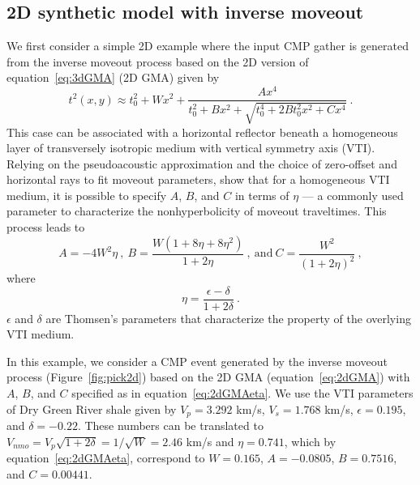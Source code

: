 \subsection{2D synthetic model with inverse moveout}

We first consider a simple 2D example where the input CMP gather is generated from the inverse moveout process based on the 2D version \cite[]{fomelstovas} of equation~\ref{eq:3dGMA} (2D GMA) given by
\begin{equation}
\label{eq:2dGMA}
t^2(x,y) \approx t^2_0 + W x^2 + \frac{A x^4}{t^2_0+Bx^2+\sqrt{t^4_0+2Bt^2_0x^2+Cx^4}} ~.
\end{equation}
This case can be associated with a horizontal reflector beneath a homogeneous layer of transversely isotropic medium with vertical symmetry axis (VTI). Relying on the pseudoacoustic approximation and the choice of zero-offset and horizontal rays to fit moveout parameters, \cite{fomelstovas} show that for a homogeneous VTI medium, it is possible to specify $A$, $B$, and $C$ in terms of $\eta$ \cite[]{alkatsvankin} --- a commonly used parameter to characterize the nonhyperbolicity of moveout traveltimes. This process leads to
\begin{equation}
\label{eq:2dGMAeta}
A = -4 W^2 \eta ~,~ B= \frac{W(1+8\eta + 8 \eta^2)}{1+2\eta}~,~\text{and}~C=\frac{W^2}{(1+2\eta)^2}~,
\end{equation}
where
\begin{equation}
  \eta = \frac{\epsilon-\delta}{1+2 \delta}~.
\end{equation}
$\epsilon$ and $\delta$ are Thomsen's parameters that characterize the property of the overlying VTI medium.

In this example, we consider a CMP event generated by the inverse moveout process (Figure~\ref{fig:pick2d}) based on the 2D GMA (equation~\ref{eq:2dGMA}) with $A$, $B$, and $C$ specified as in equation~\ref{eq:2dGMAeta}. We use the VTI parameters of Dry Green River shale \cite[]{thomsen} given by $V_p =3.292$ km/s, $V_s = 1.768$ km/s, $\epsilon=0.195$, and $\delta=-0.22$. These numbers can be translated to $V_{nmo} = V_p \sqrt{1+2\delta} = 1/\sqrt{W} = 2.46$ km/s and $\eta=0.741$, which by equation~\ref{eq:2dGMAeta}, correspond to $W=0.165$, $A=-0.0805$, $B=0.7516$, and $C=0.00441$.


